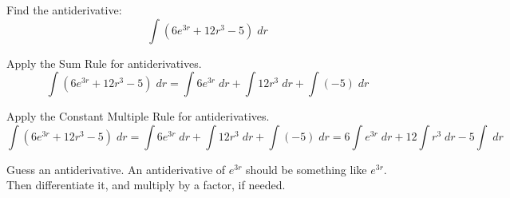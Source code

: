\documentclass{ximera}
\author{Emma Smith Zbarsky\and Nela Lakos \and Bobby Ramsey}
\begin{document}
\begin{exercise}

Find the antiderivative: \[\int \left(6e^{3r} +12r^3 -5\right)\; dr\]

\begin{hint}
	Apply the Sum Rule for antiderivatives.
	\[\int \left(6e^{3r} +12r^3 -5\right)\; dr=\int 6e^{3r}\; dr +\int12r^3\; dr+ \int(-5)\; dr\]
\end{hint}

\begin{hint}
	Apply the Constant Multiple Rule for antiderivatives.
	\[\int \left(6e^{3r} +12r^3 -5\right)\; dr=\int 6e^{3r}\; dr +\int12r^3\; dr+ \int(-5)\; dr=6\int e^{3r}\; dr +12\int r^3\; dr-5 \int\; dr\]
\end{hint}

\begin{hint}
	Guess an antiderivative.
	An antiderivative of $\displaystyle e^{3r}$ should be something like $e^{3r}$.
	Then differentiate it, and multiply by a factor, if needed.
\end{hint}

\begin{multipleChoice}
\end{multipleChoice}

\end{exercise}
\end{document}
